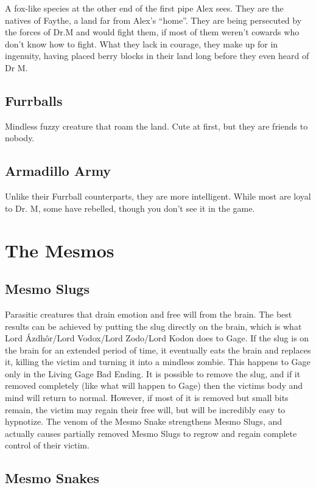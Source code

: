 \documentclass{gd-document}
\begin{document}
A fox-like species at the other end of the first pipe Alex sees. They
are the natives of Faythe, a land far from Alex's “home”. They are
being persecuted by the forces of Dr.M and would fight them, if most
of them weren't cowards who don't know how to fight. What they lack in
courage, they make up for in ingenuity, having placed berry blocks in
their land long before they even heard of Dr M.

\subsection{Furrballs}

Mindless fuzzy creature that roam the land. Cute at first, but they
are friends to nobody.

\subsection{Armadillo Army}

Unlike their Furrball counterparts, they are more intelligent. While
most are loyal to Dr. M, some have rebelled, though you don't see it
in the game.

\section{The Mesmos}

\subsection{Mesmo Slugs}

Parasitic creatures that drain emotion and free will from the
brain. The best results can be achieved by putting the slug directly
on the brain, which is what Lord Ázdhôr/Lord Vodox/Lord Zodo/Lord
Kodon does to Gage. If the slug is on the brain for an extended period
of time, it eventually eats the brain and replaces it, killing the
victim and turning it into a mindless zombie. This happens to Gage
only in the Living Gage Bad Ending. It is possible to remove the slug,
and if it removed completely (like what will happen to Gage) then the
victims body and mind will return to normal. However, if most of it is
removed but small bits remain, the victim may regain their free will,
but will be incredibly easy to hypnotize. The venom of the Mesmo Snake
strengthens Mesmo Slugs, and actually causes partially removed Mesmo
Slugs to regrow and regain complete control of their victim.

\subsection{Mesmo Snakes}
\end{document}
